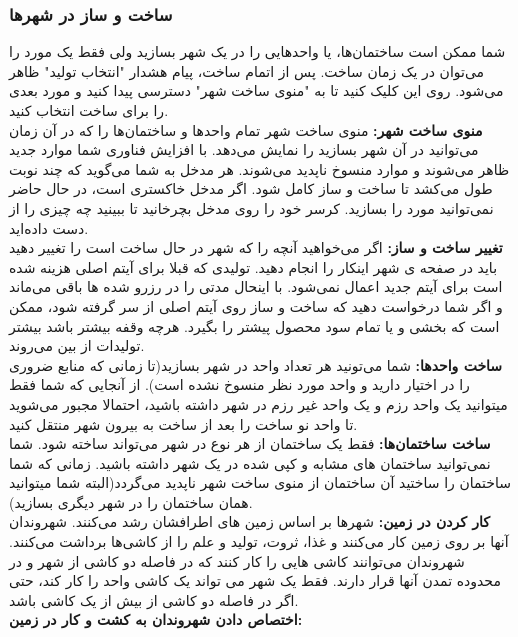 \documentclass[]{article}
\begin{document}
\subsubsection*{{\titr ساخت و ساز در شهرها}}
شما ممکن است ساختمان‌ها، یا واحدهایی را در یک شهر بسازید ولی فقط یک مورد را می‌توان در یک زمان ساخت. پس از اتمام ساخت، پیام هشدار "انتخاب تولید" ظاهر می‌شود. روی این کلیک کنید تا به "منوی ساخت شهر" دسترسی پیدا کنید و مورد بعدی را برای ساخت انتخاب کنید.
\\\noindent \textbf{منوی ساخت شهر:}
منوی ساخت شهر تمام واحدها و ساختمان‌ها را که در آن زمان می‌توانید در آن شهر بسازید را نمایش می‌دهد. با افزایش فناوری شما موارد جدید ظاهر می‌شوند و موارد منسوخ ناپدید می‌شوند. هر مدخل به شما می‌گوید که چند نوبت طول می‌کشد تا ساخت و ساز کامل شود. اگر مدخل خاکستری است، در حال حاضر نمی‌توانید مورد را بسازید. کرسر خود را روی مدخل بچرخانید تا ببینید چه چیزی را از دست داده‌اید.
\\\noindent \textbf{تغییر ساخت و ساز:}
اگر می‌خواهید آنچه را که شهر در حال ساخت است را تغییر دهید باید در صفحه ی شهر اینکار را انجام دهید. تولیدی که قبلا برای آیتم اصلی هزینه شده است برای آیتم جدید اعمال نمی‌شود. با اینحال مدتی را در رزرو شده ها باقی می‌ماند و اگر شما درخواست دهید که ساخت و ساز روی آیتم اصلی از سر گرفته شود، ممکن است که بخشی و یا تمام سود محصول پیشتر را بگیرد. هرچه وقفه بیشتر باشد بیشتر تولیدات از بین می‌روند.
\\\noindent \textbf{ساخت واحدها:}
شما می‌تونید هر تعداد واحد در شهر بسازید(تا زمانی که منابع ضروری را در اختیار دارید و واحد مورد نظر منسوخ نشده است). از آنجایی که شما فقط میتوانید یک واحد رزم و یک واحد غیر رزم در شهر داشته باشید، احتمالا مجبور می‌شوید تا واحد نو ساخت را بعد از ساخت به بیرون شهر منتقل کنید.
\\\noindent \textbf{ساخت ساختمان‌ها:}
فقط یک ساختمان از هر نوع در شهر می‌تواند ساخته شود. شما نمی‌توانید ساختمان های مشابه و کپی شده در یک شهر داشته باشید. زمانی که شما ساختمان را ساختید آن ساختمان از منوی ساخت شهر ناپدید می‌گردد(البته شما میتوانید همان ساختمان را در شهر دیگری بسازید).
\\\noindent \textbf{کار کردن در زمین:}
شهرها بر اساس زمین های اطرافشان رشد می‌کنند. شهروندان آنها بر روی زمین کار می‌کنند و غذا، ثروت، تولید و علم را از کاشی‌ها برداشت می‌کنند. شهروندان می‌توانند کاشی هایی را کار کنند که در فاصله دو کاشی از شهر و در محدوده تمدن آنها قرار دارند. فقط یک شهر می تواند یک کاشی واحد را کار کند، حتی اگر در فاصله دو کاشی از بیش از یک کاشی باشد.
\\\noindent \textbf{اختصاص دادن شهروندان به کشت و کار در زمین:}
\end{document}
